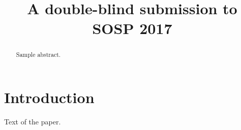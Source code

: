 \documentclass[10pt,preprint]{sigplanconf}
\date{}
\begin{document}
\title{A double-blind submission to SOSP 2017}
\maketitle

\begin{abstract}

Sample abstract.

\end{abstract}

\section{Introduction}

Text of the paper.


% 
\end{document}
